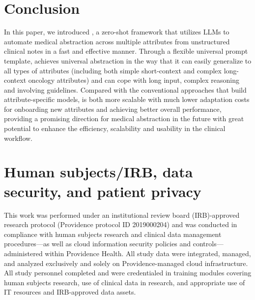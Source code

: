\section{Conclusion}
In this paper, we introduced \ours, a zero-shot framework that utilizes \acp{LLM} to automate medical abstraction across multiple attributes from unstructured clinical notes in a fast and effective manner. Through a flexible universal prompt template, \ours achieves universal abstraction in the way that it can easily generalize to all types of attributes (including both simple short-context and complex long-context oncology attributes) and can cope with long input, complex reasoning and involving guidelines. Compared with the conventional approaches that build attribute-specific models, \ours is both more scalable with much lower adaptation costs for onboarding new attributes and achieving better overall performance, providing a promising direction for medical abstraction in the future
with great potential to enhance the efficiency, scalability and usability in the clinical workflow.

\section{Human subjects/IRB, data security, and patient privacy}
This work was performed under an institutional review board (IRB)-approved research protocol (Providence protocol ID 2019000204) and was conducted in compliance with human subjects research and clinical data management procedures—as well as cloud information security policies and controls—administered within Providence Health. All study data were integrated, managed, and analyzed exclusively and solely on Providence-managed cloud infrastructure. All study personnel completed and were credentialed in training modules covering human subjects research, use of clinical data in research, and appropriate use of IT resources and IRB-approved data assets.
